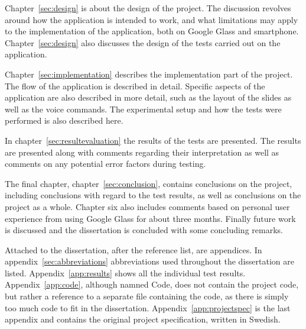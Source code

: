 Chapter~\ref{sec:design} is about the design of the project. The discussion revolves around how the application is intended to work, and what limitations may apply to the implementation of the application, both on Google Glass and smartphone. Chapter~\ref{sec:design} also discusses the design of the tests carried out on the application.

Chapter~\ref{sec:implementation} describes the implementation part of the project. The flow of the application is described in detail. Specific aspects of the application are also described in more detail, such as the layout of the slides as well as the voice commands. The experimental setup and how the tests were performed is also described here.

In chapter~\ref{sec:resultevaluation} the results of the tests are presented. The results are presented along with comments regarding their interpretation as well as comments on any potential error factors during testing.

The final chapter, chapter~\ref{sec:conclusion}, contains conclusions on the project, including conclusions with regard to the test results, as well as conclusions on the project as a whole. Chapter six also includes comments based on personal user experience from using Google Glass for about three months. Finally future work is discussed and the dissertation is concluded with some concluding remarks.

Attached to the dissertation, after the reference list, are appendices. In appendix~\ref{sec:abbreviations} abbreviations used throughout the dissertation are listed. Appendix~\ref{app:results} shows all the individual test results. Appendix~\ref{app:code}, although namned Code, does not contain the project code, but rather a reference to a separate file containing the code, as there is simply too much code to fit in the dissertation. Appendix~\ref{app:projectspec} is the last appendix and contains the original project specification, written in Swedish.